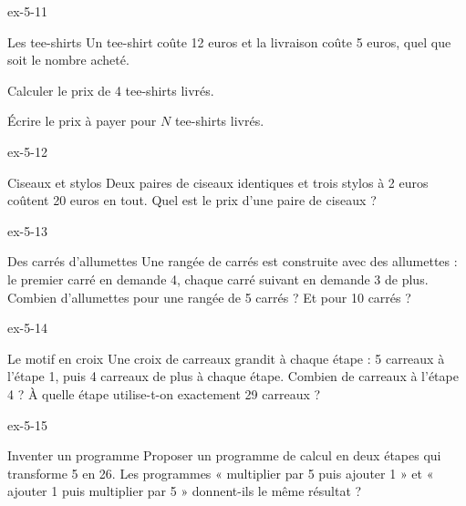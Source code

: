 \begin{blocLivre}{ex-5-11}\begin{exercice}[3]{Les tee-shirts}
Un tee-shirt coûte 12 euros et la livraison coûte 5 euros, quel que soit le nombre acheté.\begin{questions}
\item Calculer le prix de 4 tee-shirts livrés.
\item Écrire le prix à payer pour $N$ tee-shirts livrés.
\end{questions}
\end{exercice}\end{blocLivre}
\begin{blocLivre}{ex-5-12}\begin{exercice}[3]{Ciseaux et stylos}
Deux paires de ciseaux identiques et trois stylos à 2 euros coûtent 20 euros en tout. Quel est le prix d’une paire de ciseaux ?
\end{exercice}\end{blocLivre}
\begin{blocLivre}{ex-5-13}\begin{exercice}[3]{Des carrés d’allumettes}
Une rangée de carrés est construite avec des allumettes : le premier carré en demande 4, chaque carré suivant en demande 3 de plus. Combien d’allumettes pour une rangée de 5 carrés ? Et pour 10 carrés ?
\label{fig-ex-5-13}
\end{exercice}\end{blocLivre}
\begin{blocLivre}{ex-5-14}\begin{exercice}[3]{Le motif en croix}
Une croix de carreaux grandit à chaque étape : 5 carreaux à l’étape 1, puis 4 carreaux de plus à chaque étape. Combien de carreaux à l’étape 4 ? À quelle étape utilise-t-on exactement 29 carreaux ?
\label{fig-ex-5-14}
\end{exercice}\end{blocLivre}
\begin{blocLivre}{ex-5-15}\begin{exercice}[3]{Inventer un programme}
Proposer un programme de calcul en deux étapes qui transforme 5 en 26. Les programmes « multiplier par 5 puis ajouter 1 » et « ajouter 1 puis multiplier par 5 » donnent-ils le même résultat ?
\end{exercice}\end{blocLivre}

\clearpage

